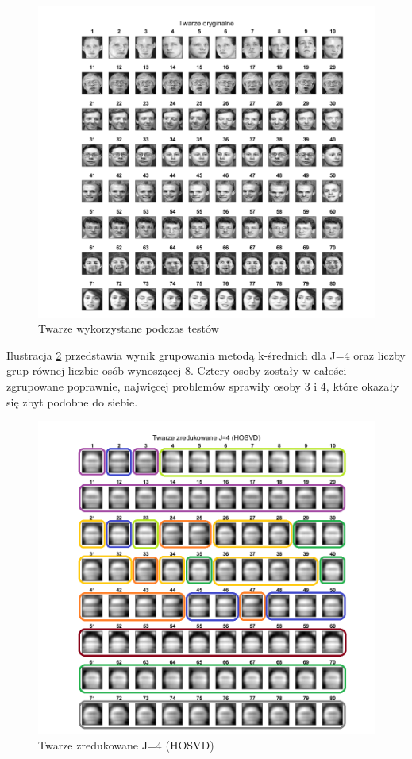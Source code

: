 \documentclass[11pt, a4paper]{article}
\newcommand{\fbi}{\leavevmode{\parindent=1em\indent}}
\begin{document}
\begin{figure}[H]
	\centering
	\includegraphics[width=1\textwidth]{./assets/twarze_org.png}
	\caption{Twarze wykorzystane podczas testów}
	\label{fig:twarze_org}
\end{figure}

\newpage
\fbi
Ilustracja \ref{fig:rezultat_HOSVD_j4} przedstawia wynik grupowania metodą k-średnich dla J=4 oraz liczby grup równej liczbie osób wynoszącej 8. Cztery osoby zostały w całości zgrupowane poprawnie, najwięcej problemów sprawiły osoby 3 i 4, które okazały się zbyt podobne do siebie.

\begin{figure}[H]
	\centering
	\includegraphics[width=1\textwidth]{./assets/rezultat_HOSVD_j4.png}
	\caption{Twarze zredukowane J=4 (HOSVD)}
	\label{fig:rezultat_HOSVD_j4}
\end{figure}
\end{document}
